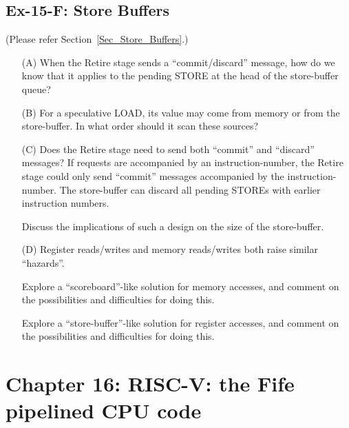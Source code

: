 
\subsection*{Ex-15-F: Store Buffers}
\label{Ex-15-F-Store-Buffers}

(Please refer Section~\ref{Sec_Store_Buffers}.)

\begin{itemize}

 \item[(A)] When the Retire stage sends a ``commit/discard'' message, how
       do we know that it applies to the pending STORE at the head of
       the store-buffer queue?

 \item[(B)] For a speculative LOAD, its value may come from memory or from
       the store-buffer.  In what order should it scan these sources?

 \item[(C)] Does the Retire stage need to send both ``commit'' and
       ``discard'' messages?  If requests are accompanied by an
       instruction-number, the Retire stage could only send ``commit''
       messages accompanied by the instruction-number.  The
       store-buffer can discard all pending STOREs with earlier
       instruction numbers.

       Discuss the implications of such a design on the size of the
       store-buffer.

 \item[(D)] Register reads/writes and memory reads/writes both raise
       similar ``hazards''.

       Explore a ``scoreboard''-like solution for memory accesses, and
       comment on the possibilities and difficulties for doing this.

       Explore a ``store-buffer''-like solution for register accesses,
       and comment on the possibilities and difficulties for doing
       this.

\end{itemize}


\hdivider

\section*{Chapter 16: RISC-V: the Fife pipelined CPU code}


